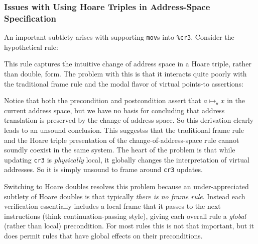 \subsubsection{Issues with Using Hoare Triples in Address-Space Specification}
\label{sec:issues}
An important subtlety arises with supporting \lstinline|mov|s into \lstinline|%cr3|. Consider the hypothetical rule:
\begin{mathpar}
\end{mathpar}
This rule captures the intuitive change of address space in a Hoare triple, rather than double, form. The problem with this is that it interacts quite poorly with the traditional frame rule and the modal flavor of virtual points-to assertions:
\begin{mathpar}
\end{mathpar}
Notice that both the precondition and postcondition assert that $a\mapsto_\mathsf{v} x$ in the current address space, but we have no basis for concluding that address translation is preserved by the change of address space. So this derivation clearly leads to an unsound conclusion. This suggestss that the traditional frame rule and the Hoare triple presentation of the change-of-address-space rule cannot soundly coexist in the same system.
The heart of the problem is that while updating \lstinline|cr3| is \emph{physically} local, it globally changes the interpretation of virtual addresses. So it is simply unsound to frame around \lstinline|cr3| updates.

Switching to Hoare doubles resolves this problem because an under-appreciated subtlety of Hoare doubles is that typically \emph{there is no frame rule}. Instead each verification essentially includes a local frame that it passes to the next instructions (think continuation-passing style), giving each overall rule a \emph{global} (rather than local) precondition. For most rules this is not that important, but it does permit rules that have global effects on their preconditions.

